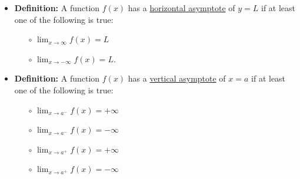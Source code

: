 \documentclass[12pt]{article}
\begin{document}

\begin{itemize}

\item {\bf Definition:} A function $f(x)$ has a \underline{horizontal asymptote} of $y=L$ if at least one of the following is true:

\begin{itemize}

\item[$\circ$] $\displaystyle \lim_{x \rightarrow \infty}{f(x)}=L$

\item[$\circ$] $\displaystyle \lim_{x \rightarrow -\infty}{f(x)}=L$.

\end{itemize}

\item {\bf Definition:} A function $f(x)$ has a \underline{vertical asymptote} of $x=a$ if at least one of the following is true:

\begin{itemize}

\item[$\circ$] $\displaystyle \lim_{x \rightarrow a^-}{f(x)}=+\infty$

\item[$\circ$] $\displaystyle \lim_{x \rightarrow a^-}{f(x)}=-\infty$

\item[$\circ$] $\displaystyle \lim_{x \rightarrow a^+}{f(x)}=+\infty$

\item[$\circ$] $\displaystyle \lim_{x \rightarrow a^+}{f(x)}=-\infty$

\end{itemize}

\end{itemize}
\end{document}

